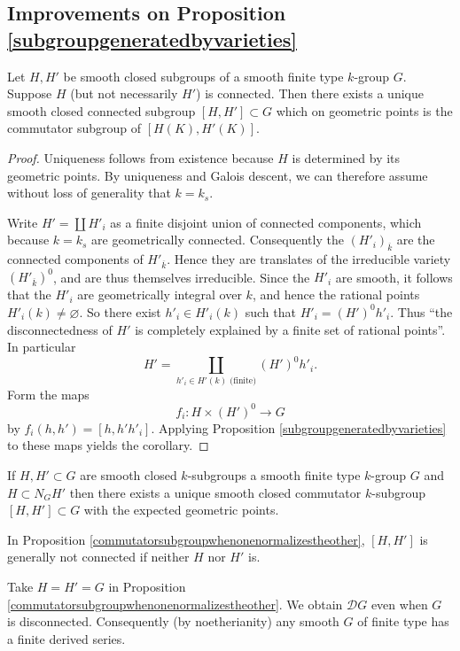 \documentclass[10pt]{article}
\newcommand{\sD}{\mathscr{D}}
\renewcommand{\(}{\left(}
\renewcommand{\)}{\right)}
\renewcommand{\bar}{\overline}
\numberwithin{thm}{subsection}
\begin{document}
\subsection{Improvements on Proposition \ref{subgroupgeneratedbyvarieties}}
\begin{cor}\label{derivedsubgroupcor}
Let $H,H'$ be smooth closed subgroups
of a smooth finite type $k$-group $G$.
Suppose $H$ (but not necessarily $H'$) is connected.
Then there exists a unique smooth closed connected subgroup $[H,H']\subset G$
which on geometric points is the commutator subgroup
of $[H(K),H'(K)]$.
\end{cor}
\begin{proof}
Uniqueness follows from existence because $H$ is determined by its geometric points.
By uniqueness and Galois descent, we can therefore assume without loss of generality
that $k=k_s$.

Write $H'=\coprod H'_i$ as a finite disjoint union of connected components,
which because $k=k_s$ are geometrically connected.
Consequently the $(H'_i)_{\bar k}$ are the connected components of $H'_{\bar k}$.
Hence they are translates of the irreducible variety $(H'_{\bar k})^0$,
and are thus themselves irreducible.
Since the $H'_i$ are smooth, it follows
that the $H'_i$ are geometrically integral over $k$,
and hence the rational points $H'_i(k)\neq\varnothing$.
So there exist $h'_i\in H'_i(k)$
such that $H'_i=(H')^0h'_i$.
Thus ``the disconnectedness of $H'$ is completely explained by a finite set of rational points''.
In particular
\[H'=\coprod_{h'_i\in H'(k)\text{ (finite)}}(H')^0h'_i.\]
Form the maps
\[f_i:H\times (H')^0\to G\]
 by $f_i(h,h')=[h,h'h'_i]$.
Applying Proposition \ref{subgroupgeneratedbyvarieties}
to these maps yields the corollary.
\end{proof}
\begin{prop}\label{commutatorsubgroupwhenonenormalizestheother}
If $H,H'\subset G$ are smooth closed $k$-subgroups
a smooth finite type $k$-group $G$
and $H\subset N_GH'$ then there exists a unique smooth closed commutator
$k$-subgroup $[H,H']\subset G$ with the expected geometric points.
\end{prop}
\begin{rem}In Proposition \ref{commutatorsubgroupwhenonenormalizestheother},
$[H,H']$ is generally not connected if
neither $H$ nor $H'$ is.
\end{rem}
\begin{ex}\label{derivedsubgroupfordisconnectedG}
Take $H=H'=G$ in Proposition \ref{commutatorsubgroupwhenonenormalizestheother}.
We obtain $\sD G$ even when $G$ is disconnected.
Consequently (by noetherianity) any smooth $G$ of finite type
has a finite derived series.
\end{ex}
\end{document}
